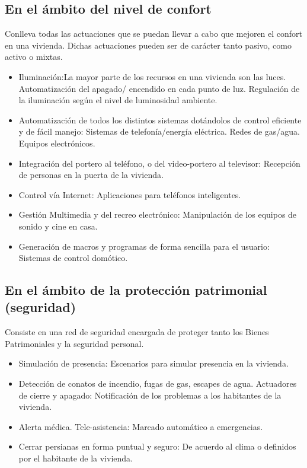 \documentclass[11pt,letterpaper]{report}
\begin{document}
	\subsection{En el ámbito del nivel de confort}
	Conlleva todas las actuaciones que se
puedan llevar a cabo que mejoren el confort en una vivienda.
Dichas actuaciones pueden ser de carácter tanto pasivo,
como activo o mixtas. 
	\begin{itemize}
		\item Iluminación:La mayor parte de los recursos en una vivienda son las luces.
			\subitem Automatización del apagado/ encendido en cada punto de luz.
			\subitem Regulación de la iluminación según el nivel de luminosidad ambiente.
		\item Automatización de todos los distintos sistemas dotándolos de control eficiente y de fácil manejo:
			\subitem Sistemas de telefonía/energía eléctrica.
			\subitem Redes de gas/agua.
			\subitem Equipos electrónicos.
		\item Integración del portero al teléfono, o del video-portero al televisor:
			\subitem Recepción de personas en la puerta de la vivienda.
		\item Control vía Internet:
			\subitem Aplicaciones para teléfonos inteligentes.
		\item Gestión Multimedia y del recreo electrónico:
			\subitem Manipulación de los equipos de sonido y cine en casa.
		\item Generación de macros y programas de forma sencilla para el usuario:
			\subitem Sistemas de control domótico.
	\end{itemize}
	\subsection{En el ámbito de la protección patrimonial (seguridad)}
	Consiste en una red de seguridad encargada de proteger tanto los Bienes Patrimoniales y la seguridad personal.
		\begin{itemize}
		\item Simulación de presencia:
			\subitem Escenarios para simular presencia en la vivienda.
		\item Detección de conatos de incendio, fugas de gas, escapes de agua.
			\subitem Actuadores de cierre y apagado:
			\subitem Notificación de los problemas a los habitantes de la vivienda.
		\item Alerta médica. Tele-asistencia:
			\subitem Marcado automático a emergencias.
		\item Cerrar  persianas en forma puntual y seguro:
			\subitem De acuerdo al clima o definidos por el habitante de la vivienda.
		
		\end{itemize}
\end{document}
